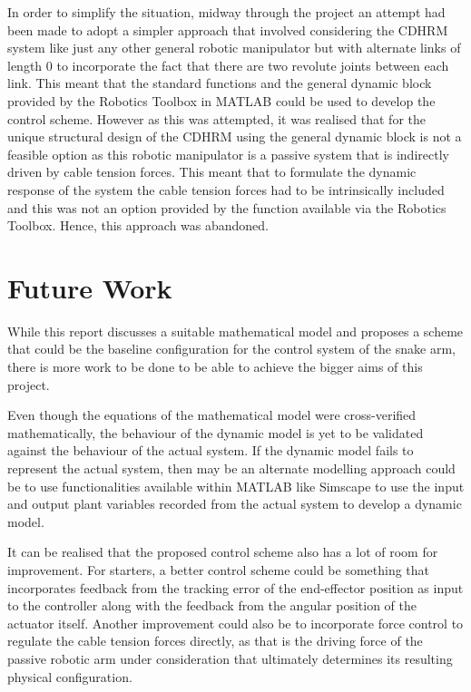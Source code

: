 \documentclass[a4paper,12pt]{report}
\begin{document}
In order to simplify the situation, midway through the project an attempt had been made to adopt a simpler approach that involved considering the CDHRM system like just any other general robotic manipulator but with alternate links of length 0 to incorporate the fact that there are two revolute joints between each link. This meant that the standard functions and the general dynamic block provided by the Robotics Toolbox in  MATLAB could be used to develop the control scheme. However as this was attempted, it was realised that for the unique structural design of the CDHRM using the general dynamic block is not a feasible option as this robotic manipulator is a passive system that is indirectly driven by cable tension forces. This meant that to formulate the dynamic response of the system the cable tension forces had to be intrinsically included and this was not an option provided by the function available via the Robotics Toolbox. Hence, this approach was abandoned. 

\section{Future Work}

While this report discusses a suitable mathematical model and proposes a scheme that could be the baseline configuration for the control system of the snake arm, there is more work to be done to be able to achieve the bigger aims of this project. 

Even though the equations of the mathematical model were cross-verified mathematically, the behaviour of the dynamic model is yet to be validated against the behaviour of the actual system. If the dynamic model fails to represent the actual system, then may be an alternate modelling approach could be to use functionalities available within MATLAB like Simscape to use the input and output plant variables recorded from the actual system to develop a dynamic model.

It can be realised that the proposed control scheme also has a lot of room for improvement. For starters, a better control scheme could be something that incorporates feedback from the tracking error of the end-effector position as input to the controller along with the feedback from the angular position of the actuator itself. Another improvement could also be to incorporate force control to regulate the cable tension forces directly, as that is the driving force of the passive robotic arm under consideration that ultimately determines its resulting physical configuration.
\end{document}

